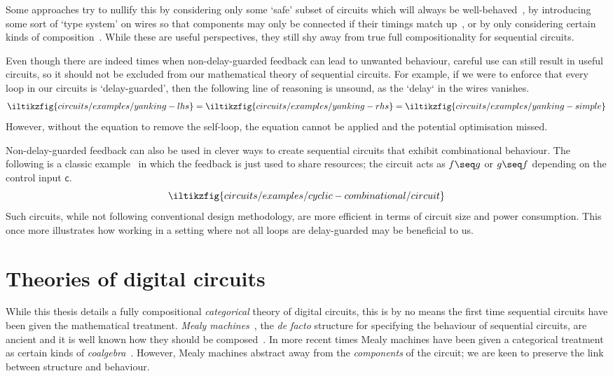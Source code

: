 Some approaches try to nullify this by considering only some `safe' subset of
circuits which will always be well-behaved~\cite{christensen2021wire}, by
introducing some sort of `type system' on wires so that components may only be
connected if their timings match up~\cite{nigam2023modular}, or by only
considering certain kinds of composition~\cite{alekseyev2014compositional}.
While these are useful perspectives, they still shy away from true full
compositionality for sequential circuits.

Even though there are indeed times when non-delay-guarded feedback can lead to
unwanted behaviour, careful use can still result in useful circuits, so it
should not be excluded from our mathematical theory of sequential circuits.
For example, if we were to enforce that every loop in our circuits is
`delay-guarded', then the following line of reasoning is unsound, as the `delay`
in the wires vanishes.
\[
    \iltikzfig{circuits/examples/yanking-lhs}
    =
    \iltikzfig{circuits/examples/yanking-rhs}
    =
    \iltikzfig{circuits/examples/yanking-simple}
\]
However, without the equation to remove the self-loop, the equation cannot be
applied and the potential optimisation missed.

Non-delay-guarded feedback can also be used in clever ways to create sequential
circuits that exhibit combinational behaviour.
The following is a classic example~\cite{malik1994analysis} in which the
feedback is just used to share resources; the circuit acts as \(f \seq g\) or
\(g \seq f\) depending on the control input \(\mathsf{c}\).
\[
    \iltikzfig{circuits/examples/cyclic-combinational/circuit}
\]
Such circuits, while not following conventional design methodology, are more
efficient in terms of circuit size and power consumption.
This once more illustrates how working in a setting where not all loops are
delay-guarded may be beneficial to us.

\section{Theories of digital circuits}

While this thesis details a fully compositional
\emph{categorical} theory of digital circuits, this is by no means the first
time sequential circuits have been given the mathematical treatment.
\emph{Mealy machines}~\cite{mealy1955method}, the \emph{de facto} structure for
specifying the behaviour of sequential circuits, are ancient and it is well
known how they should be composed~\cite{ginzburg2014algebraic}.
In more recent times Mealy machines have been given a categorical treatment as
certain kinds of \emph{coalgebra}~\cite{rutten2006algebraic,bonsangue2008coalgebraic}.
However, Mealy machines abstract away from the \emph{components} of the circuit;
we are keen to preserve the link between structure and behaviour.

